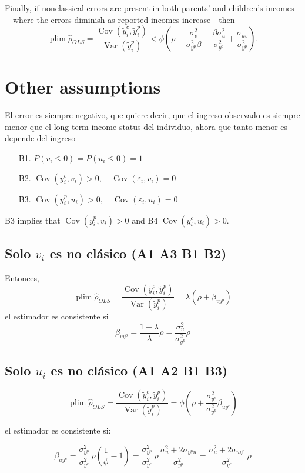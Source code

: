 \documentclass[12pt,oneside]{article}
\DeclareMathOperator*{\plim}{plim}
\theoremstyle{bracket}
\begin{document}
Finally, if nonclassical errors are present in both parents' and children's incomes—where the errors diminish as reported incomes increase—then
\[
\plim \hat{\rho}_{OLS} 
= \frac{\operatorname{Cov}(\tilde{y}_i^c,\tilde{y}_i^p)}{\operatorname{Var}(\tilde{y}_i^p)} 
< \phi \left(\rho - \frac{\sigma^2_v}{\sigma^2_{y^p} \beta} - \frac{\beta \sigma^2_u}{\sigma^2_{y^p}} + \frac{\sigma_{uv}}{\sigma^2_{y^p}} \right).
\]


\section{Other assumptions}
El error es siempre negativo, que quiere decir, que el ingreso observado es siempre menor que el long term income status del individuo, ahora que tanto menor es depende del ingreso 
\begin{itemize}
    \item[B1.] $P(v_i\leq 0) = P(u_i\leq 0)= 1$ 
    \item[B2.] $\operatorname{Cov}(y^c_i,v_i) >0,\quad \operatorname{Cov}(\varepsilon_i,v_i)=0$
    \item[B3.] $\operatorname{Cov}(y^p_i,u_i) >0,\quad \operatorname{Cov}(\varepsilon_i,u_i)=0$
\end{itemize}
B3 implies that $\operatorname{Cov}(y_i^p,v_i)>0$ and B4 $ \operatorname{Cov}(y^c_i,u_i)>0$.

\subsection{Solo $v_i$ es no clásico (A1 A3 B1 B2)}
Entonces, 
\[
\plim \hat{\rho}_{OLS} 
= \frac{\operatorname{Cov}(\tilde{y}_i^c,\tilde{y}_i^p)}{\operatorname{Var}(\tilde{y}_i^p)}
=\lambda(\rho+\beta_{vy^p})
\]
el estimador es consistente si 
$$\beta_{vy^p} = \frac{1-\lambda}{\lambda} \rho = \frac{\sigma^2_u}{\sigma^2_{y^p}}\rho$$

\subsection{Solo $u_i$ es no clásico (A1 A2 B1 B3)}

\[
\plim \hat{\rho}_{OLS} 
= \frac{\operatorname{Cov}(\tilde{y}_i^c,\tilde{y}_i^p)}{\operatorname{Var}(\tilde{y}_i^p)}
=\phi(\rho+\frac{\sigma^2_{y^c}}{\sigma^2_{y^p}}\beta_{uy^c})
\]

el estimador es consistente si:

\[
\beta_{uy^c} 
= \frac{\sigma^2_{y^p}}{\sigma^2_{y^c}} \, \rho \left( \frac{1}{\phi} - 1 \right)
= \frac{\sigma^2_{y^p}}{\sigma^2_{y^c}} \, \rho \, \frac{\sigma^2_u + 2 \sigma_{y^pu}}{\sigma^2_{y^p}}
= \frac{\sigma^2_u + 2 \sigma_{uy^p}}{\sigma^2_{y^c}} \, \rho
\]
\end{document}
